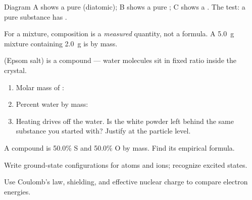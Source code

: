 \documentclass{apchem-notes}
\begin{document}
Diagram A shows a pure  (diatomic);
B shows a pure ;
C shows a .
The test: a pure substance has .


For a mixture, composition is a \emph{measured} quantity, not a formula.
A \SI{5.0}{\gram} mixture containing \SI{2.0}{\gram}  is
  by mass.


 (Epsom salt) is a compound --- water molecules sit in fixed
ratio inside the crystal.

\begin{enumerate}[leftmargin=*,itemsep=0.4em]
  \item Molar mass of : \workspace[1.8cm]
  \item Percent water by mass: \workspace[1.8cm]
  \item Heating drives off the water. Is the white powder left behind the same
        substance you started with? Justify at the particle level.
\end{enumerate}

\begin{exitticket}
A compound is 50.0\% S and 50.0\% O by mass. Find its empirical formula.
\end{exitticket}


\begin{objectives}
  \item Write ground-state configurations for atoms and ions; recognize
        excited states.
  \item Use Coulomb's law, shielding, and effective nuclear charge to compare
        electron energies.
\end{objectives}
\end{document}

